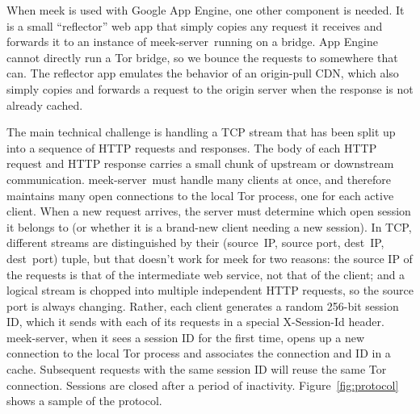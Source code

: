 \documentclass[conference]{IEEEtran}
\def\meekserver{\mbox{meek-server}}
\begin{document}
When meek is used with Google App Engine, one other component is needed.
It is a small ``reflector'' web app that simply copies any request
it receives and forwards it to an instance of \meekserver\ running on a bridge.
App Engine cannot directly run a Tor bridge,
so we bounce the requests to somewhere that can.
The reflector app emulates the behavior of an origin-pull CDN,
which also simply copies and forwards a request to the origin server
when the response is not already cached.

The main technical challenge is handling a TCP stream
that has been split up into a sequence of HTTP requests and responses.
The body of each HTTP request and HTTP response carries
a small chunk of upstream or downstream communication.
\meekserver\ must handle many clients at once,
and therefore maintains many open connections to the local Tor process,
one for each active client.
When a new request arrives, the server must determine which
open session it belongs to
(or whether it is a brand-new client needing a new session).
In TCP, different streams are distinguished by their
(source~IP, source port, dest~IP, dest~port) tuple,
but that doesn't work for meek for two reasons:
the source IP of the requests is that of the intermediate web service,
not that of the client;
and a logical stream is chopped into multiple independent HTTP requests,
so the source port is always changing.
Rather, each client generates a random 256-bit session ID,
which it sends with each of its requests in a special
X-Session-Id header.
\meekserver, when it sees a session ID for the first time,
opens up a new connection to the local Tor process
and associates the connection and ID in a cache.
Subsequent requests with the
same session ID will reuse the same Tor connection.
Sessions are closed after a period of inactivity.
Figure~\ref{fig:protocol} shows a sample of the protocol.
\end{document}
